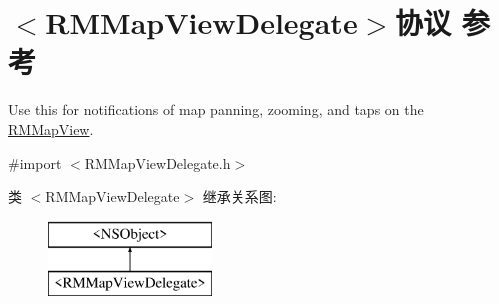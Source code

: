 \hypertarget{protocol_r_m_map_view_delegate-p}{\section{$<$R\-M\-Map\-View\-Delegate$>$协议 参考}
\label{protocol_r_m_map_view_delegate-p}
}


Use this for notifications of map panning, zooming, and taps on the \hyperlink{interface_r_m_map_view}{R\-M\-Map\-View}.  




{\ttfamily \#import $<$R\-M\-Map\-View\-Delegate.\-h$>$}

类 $<$R\-M\-Map\-View\-Delegate$>$ 继承关系图\-:\begin{figure}[H]
\begin{center}
\leavevmode
\includegraphics[height=2.000000cm]{protocol_r_m_map_view_delegate-p}
\end{center}
\end{figure}
